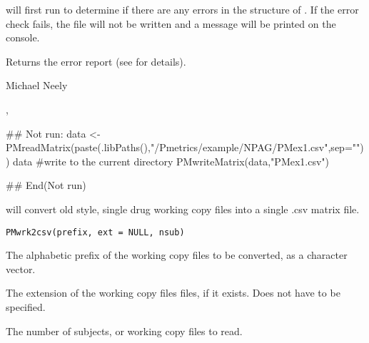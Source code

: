 \documentclass[a4paper]{book}
\begin{document}
%
\begin{Details}\relax
{} will first run  to determine
if there are any errors in the structure of  .  If the error check
fails, the file will not be written and a message will be printed on the console.
\end{Details}
%
\begin{Value}
Returns the error report (see  for details).
\end{Value}
%
\begin{Author}\relax
Michael Neely
\end{Author}
%
\begin{SeeAlso}\relax
{}, 
\end{SeeAlso}
%
\begin{Examples}
\begin{ExampleCode}
## Not run: 
data <- PMreadMatrix(paste(.libPaths(),"/Pmetrics/example/NPAG/PMex1.csv",sep=""))
data
#write to the current directory
PMwriteMatrix(data,"PMex1.csv")

## End(Not run)
\end{ExampleCode}
\end{Examples}
%
\begin{Description}\relax
{} will convert old style, single drug working copy files into
a single .csv matrix file.
\end{Description}
%
\begin{Usage}
\begin{verbatim}
PMwrk2csv(prefix, ext = NULL, nsub)
\end{verbatim}
\end{Usage}
%
\begin{Arguments}
\begin{ldescription}
\item[\code{prefix}] The alphabetic prefix of the working copy files to be converted,
as a character vector.

\item[\code{ext}] The extension of the working copy files files, if it exists.
Does not have to be specified.

\item[\code{nsub}] The number of subjects, or working copy files to read.
\end{ldescription}
\end{Arguments}
\end{document}
